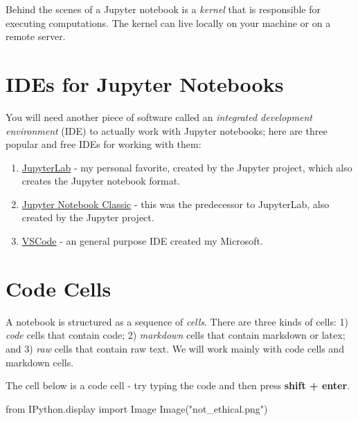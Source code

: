 \documentclass[
  letterpaper,
  DIV=11,
  numbers=noendperiod]{scrreprt}
\newenvironment{Shaded}{\begin{snugshade}}{\end{snugshade}}
\newcommand{\ImportTok}[1]{\textcolor[rgb]{0.00,0.46,0.62}{#1}}
\newcommand{\NormalTok}[1]{\textcolor[rgb]{0.00,0.23,0.31}{#1}}
\newcommand{\StringTok}[1]{\textcolor[rgb]{0.13,0.47,0.30}{#1}}
\providecommand{\tightlist}{%
  \setlength{\itemsep}{0pt}\setlength{\parskip}{0pt}}\usepackage{longtable,booktabs,array}
\begin{document}
Behind the scenes of a Jupyter notebook is a \emph{kernel} that is
responsible for executing computations. The kernel can live locally on
your machine or on a remote server.

\hypertarget{ides-for-jupyter-notebooks}{%
\section{IDEs for Jupyter Notebooks}\label{ides-for-jupyter-notebooks}}

You will need another piece of software called an \emph{integrated
development environment} (IDE) to actually work with Jupyter notebooks;
here are three popular and free IDEs for working with them:

\begin{enumerate}
\def\labelenumi{\arabic{enumi}.}
\tightlist
\item
  \href{https://jupyter.org/}{JupyterLab} - my personal favorite,
  created by the Jupyter project, which also creates the Jupyter
  notebook format.
\item
  \href{https://jupyter.org/}{Jupyter Notebook Classic} - this was the
  predecessor to JupyterLab, also created by the Jupyter project.
\item
  \href{https://code.visualstudio.com/}{VSCode} - an general purpose IDE
  created my Microsoft.
\end{enumerate}

\hypertarget{code-cells}{%
\section{Code Cells}\label{code-cells}}

A notebook is structured as a sequence of \emph{cells}. There are three
kinds of cells: 1) \emph{code} cells that contain code; 2)
\emph{markdown} cells that contain markdown or latex; and 3) \emph{raw}
cells that contain raw text. We will work mainly with code cells and
markdown cells.

The cell below is a code cell - try typing the code and then press
\textbf{shift + enter}.

\begin{Shaded}
\begin{Highlighting}[]
\ImportTok{from}\NormalTok{ IPython.display }\ImportTok{import}\NormalTok{ Image}
\NormalTok{Image(}\StringTok{"not\_ethical.png"}\NormalTok{)}
\end{Highlighting}
\end{Shaded}
\end{document}
